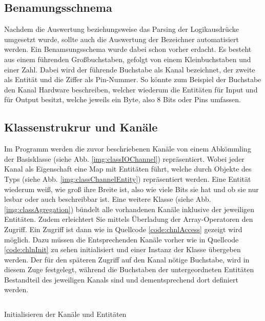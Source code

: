 \subsection{Benamungsschnema}\label{kap:ums:banamsung}
Nachdem die Auswertung beziehungsweise das Parsing der Logikausdrücke umgesetzt wurde, sollte auch die Auswertung der Bezeichner automatisiert werden. Ein Benamsungsschema wurde dabei schon vorher erdacht. Es besteht aus einem führenden Großbuchstaben, gefolgt von einem Kleinbuchstaben und einer Zahl. Dabei wird der führende Buchstabe als Kanal bezeichnet, der zweite als Entität und die Ziffer als Pin-Nummer. So könnte zum Beispiel der Buchstabe  den Kanal Hardware beschreiben, welcher wiederum die Entitäten  für Input und  für Output besitzt, welche jeweils ein Byte, also 8 Bits oder Pins umfassen. 

\subsection{Klassenstrukrur und Kanäle}\label{kap:ums:klassen}
Im Programm werden die zuvor beschriebenen Kanäle von einem Abkömmling der Basisklasse  (siehe Abb. \ref{img:classIOChannel}) repräsentiert. Wobei jeder Kanal als Eigenschaft eine Map mit Entitäten führt, welche durch Objekte des Typs  (siehe Abb. \ref{img:classChannelEntity}) repräsentiert werden. Eine Entität wiederum weiß, wie groß ihre Breite ist, also wie viele Bits sie hat und ob sie nur lesbar oder auch beschreibbar ist. Eine weitere Klasse  (siehe Abb. \ref{img:classAgregation}) bündelt alle vorhandenen Kanäle inklusive der jeweiligen Entitäten. Zudem erleichtert Sie mittels Überladung der Array-Operatoren den Zugriff. Ein Zugriff ist dann wie in Quellcode \ref{code:chnlAccess} gezeigt wird möglich. Dazu müssen die Entsprechenden Kanäle vorher wie in Quellcode \ref{code:chlnInit} zu sehen initialisiert und einer Instanz der Klasse  übergeben werden. Der für den späteren Zugriff auf den Kanal nötige Buchstabe, wird in diesem Zuge festgelegt, während die Buchstaben der untergeordneten Entitäten Bestandteil des jeweiligen Kanals sind und dementsprechend dort definiert werden. 


\begin{listing}[H]
	\inputminted[numbersep=1pt,fontsize=\scriptsize,frame=single, firstline=364,lastline=369]{c}{./code/main-klassenstruktur.cpp}
	\caption{Initialisieren der Kanäle und Entitäten}
	\label{code:chlnInit}
\end{listing}


